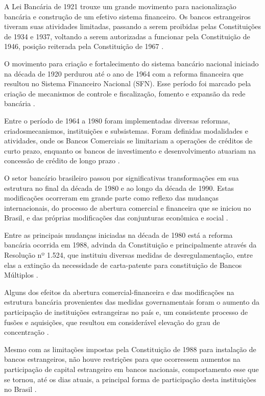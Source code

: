 \documentclass[
  12pt,
  12pt,
  openright,
  oneside,
  a4paper,
  chapter=TITLE,
  section=TITLE,
  subsection=TITLE,
  subsubsection=TITLE,
  portugues,
  sumario=tradicional]{abntex2}
\begin{document}
A Lei Bancária de 1921 trouxe um grande movimento para nacionalização bancária e construção de um efetivo sistema financeiro. Os bancos estrangeiros tiveram suas atividades limitadas, passando a serem proibidas pelas Constituições de 1934 e 1937, voltando a serem autorizadas a funcionar pela Constituição de 1946, posição reiterada pela Constituição de 1967 \cite{camargo:2009, decreto:1921, guimaraes:2011}.

O movimento para criação e fortalecimento do sistema bancário nacional iniciado na década de 1920 perdurou até o ano de 1964 com a reforma financeira que resultou no Sistema Financeiro Nacional (SFN). Esse período foi marcado pela criação de mecanismos de controle e fiscalização, fomento e expansão da rede bancária \cite{camargo:2009, guimaraes:2011}.

Entre o período de 1964 a 1980 foram implementadas diversas reformas, criadosmecanismos, instituições e subsistemas. Foram definidas modalidades e atividades, onde os Bancos Comerciais se limitariam a operações de créditos de curto prazo, enquanto os bancos de investimento e desenvolvimento atuariam na concessão de crédito de longo prazo \cite{camargo:2009}.

O setor bancário brasileiro passou por significativas transformações em sua estrutura no final da década de 1980 e ao longo da década de 1990. Estas modificações ocorreram em grande parte como reflexo das mudanças internacionais, do processo de abertura comercial e financeira que se iniciou no Brasil, e das próprias modificações das conjunturas econômica e social \cite{camargo:2009}.

Entre as principais mudanças iniciadas na década de 1980 está a reforma bancária ocorrida em 1988, advinda da Constituição e principalmente através da Resolução nº 1.524, que instituiu diversas medidas de desregulamentação, entre elas a extinção da necessidade de carta-patente para constituição de Bancos Múltiplos \cite{Res:1524:1988}.

Alguns dos efeitos da abertura comercial-financeira e das modificações na estrutura bancária provenientes das medidas governamentais foram o aumento da participação de instituições estrangeiras no país e, um consistente processo de fusões e aquisições, que resultou em considerável elevação do grau de concentração \cite{camargo:2009}.

Mesmo com as limitações impostas pela Constituição de 1988 \cite{constituicao:1988} para instalação de bancos estrangeiros, não houve restrições para que ocorressem aumentos na participação de capital estrangeiro em bancos nacionais, comportamento esse que se tornou, até os dias atuais, a principal forma de participação desta instituições no Brasil \cite{camargo:2009}.
\end{document}
